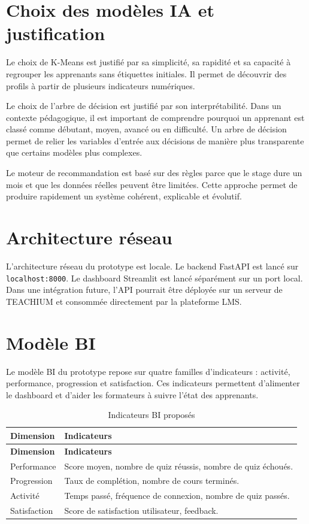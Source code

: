 \documentclass[12pt,a4paper]{report}
\begin{document}
\section{Choix des modèles IA et justification}

Le choix de K-Means est justifié par sa simplicité, sa rapidité et sa capacité à regrouper les apprenants sans étiquettes initiales. Il permet de découvrir des profils à partir de plusieurs indicateurs numériques.

Le choix de l'arbre de décision est justifié par son interprétabilité. Dans un contexte pédagogique, il est important de comprendre pourquoi un apprenant est classé comme débutant, moyen, avancé ou en difficulté. Un arbre de décision permet de relier les variables d'entrée aux décisions de manière plus transparente que certains modèles plus complexes.

Le moteur de recommandation est basé sur des règles parce que le stage dure un mois et que les données réelles peuvent être limitées. Cette approche permet de produire rapidement un système cohérent, explicable et évolutif.

\section{Architecture réseau}

L'architecture réseau du prototype est locale. Le backend FastAPI est lancé sur \texttt{localhost:8000}. Le dashboard Streamlit est lancé séparément sur un port local. Dans une intégration future, l'API pourrait être déployée sur un serveur de TEACHIUM et consommée directement par la plateforme LMS.

\section{Modèle BI}

Le modèle BI du prototype repose sur quatre familles d'indicateurs : activité, performance, progression et satisfaction. Ces indicateurs permettent d'alimenter le dashboard et d'aider les formateurs à suivre l'état des apprenants.

\begin{longtable}{|p{4cm}|p{10cm}|}
\caption{Indicateurs BI proposés}\\
\hline
\textbf{Dimension} & \textbf{Indicateurs} \\
\hline
\endfirsthead
\hline
\textbf{Dimension} & \textbf{Indicateurs} \\
\hline
\endhead
Performance & Score moyen, nombre de quiz réussis, nombre de quiz échoués. \\
\hline
Progression & Taux de complétion, nombre de cours terminés. \\
\hline
Activité & Temps passé, fréquence de connexion, nombre de quiz passés. \\
\hline
Satisfaction & Score de satisfaction utilisateur, feedback. \\
\hline
\end{longtable}
\end{document}
